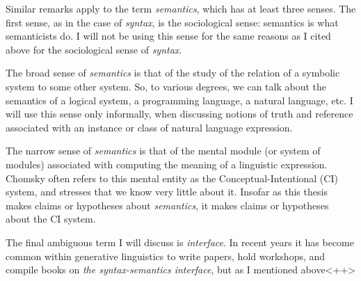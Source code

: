 \documentclass[MilwayThesis]{subfiles}
\begin{document}
Similar remarks apply to the term \textit{semantics}, which has at least three senses.
The first sense, as in the case of \textit{syntax}, is the sociological sense: semantics is what semanticists do.
I will not be using this sense for the same reasons as I cited above for the sociological sense of \textit{syntax}.

The broad sense of \textit{semantics} is that of the study of the relation of a symbolic system to some other system.
So, to various degrees, we can talk about the semantics of a logical system, a programming language, a natural language, etc.
I will use this sense only informally, when discussing notions of truth and reference associated with an instance or class of natural language expression.

The narrow sense of \textit{semantics} is that of the mental module (or system of modules) associated with computing the meaning of a linguistic expression.
Chomsky often refers to this mental entity as the Conceptual-Intentional (CI) system, and stresses that we know very little about it.
Insofar as this thesis makes claims or hypotheses about \textit{semantics}, it makes claims or hypotheses about the CI system.

The final ambiguous term I will discuss is \textit{interface}.
In recent years it has become common within generative linguistics to write papers, hold workshops, and compile books on \textit{the syntax-semantics interface}, but as I mentioned above<++>
\end{document}
